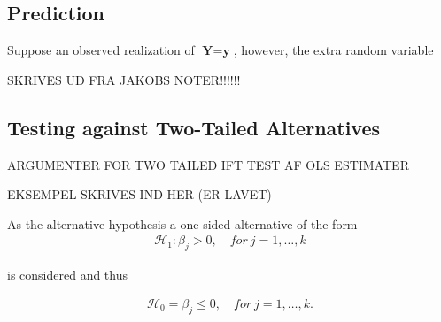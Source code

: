 \subsection{Prediction}

Suppose an observed realization of $\textbf{Y}=\textbf{y}$, however, the extra random variable 

SKRIVES UD FRA JAKOBS NOTER!!!!!!

\subsection{Testing against Two-Tailed Alternatives}

ARGUMENTER FOR TWO TAILED IFT TEST AF OLS ESTIMATER

EKSEMPEL SKRIVES IND HER (ER LAVET)

As the alternative hypothesis a one-sided alternative of the form
\begin{align}\label{eq:onesided_alt}
    \mathcal{H}_1:\beta_j>0 , \quad for \ j=1,\ldots,k
\end{align}

is considered and thus

\begin{align}\label{eq:onesided_h0}
    \mathcal{H}_0=\beta_j \leq 0 , \quad for \ j=1,\ldots,k.
\end{align}









